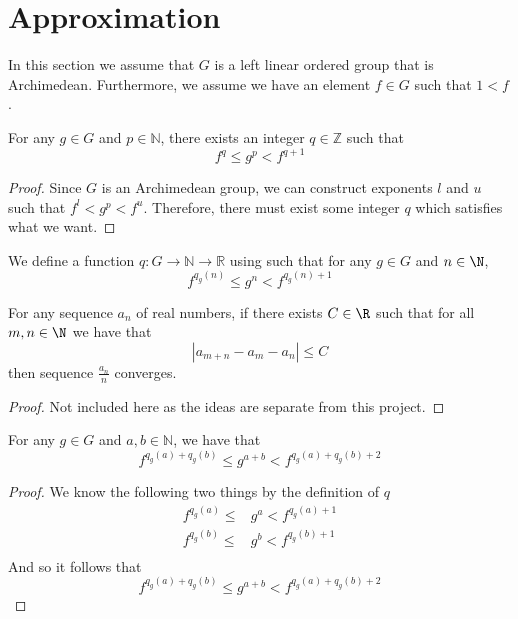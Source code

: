 \section{Approximation}
In this section we assume that $G$ is a left linear ordered group
that is Archimedean. Furthermore, we assume we have an element $f\in G$
such that $1 < f$.
\begin{theorem}\label{approximate}
    \leanok
    For any $g \in G$ and $p \in \mathbb{N}$,
    there exists an integer $q \in \mathbb{Z}$
    such that
    \[
        f^q \le g^p < f^{q+1}
    \]
\end{theorem}
\begin{proof}\leanok
Since $G$ is an Archimedean group, we can construct exponents $l$ and $u$
such that $f^l < g^p < f^u$. Therefore, there must exist some integer $q$
which satisfies what we want.
\end{proof}

\begin{definition}\label{def:q}
    \leanok{}
    We define a function $q \colon G \to \mathbb{N} \to \mathbb{R}$
    using  such that for any $g\in G$ and $n \in \N$,
    \[
        f^{q_g(n)} \le g^n < f^{q_g(n)+1}
    \]
\end{definition}

\begin{theorem}\label{sequence_convergence}
    \leanok
    For any sequence $a_n$ of real numbers,
    if there exists $C \in \R$ such that for all $m,n\in \N$
    we have that
    \[
        |a_{m+n} - a_m - a_n| \le C
    \]
    then sequence $\frac{a_n}{n}$ converges.
\end{theorem}
\begin{proof}\leanok
Not included here as the ideas
are separate from this project.
\end{proof}

\begin{theorem}\label{q_exp_add}
    \leanok{}
    For any $g \in G$ and $a,b \in \mathbb{N}$, we have that
    \[
        f^{q_g(a) + q_g(b)} \le g^{a+b} < f^{q_g(a) + q_g(b) + 2}
    \]
\end{theorem}
\begin{proof}\leanok
We know the following two things by the definition of $q$
\begin{align*}
f^{q_g(a)}\le &g^a < f^{q_g(a)+1}\\
f^{q_g(b)}\le &g^b < f^{q_g(b)+1}\\
\end{align*}
And so it follows that
\[
f^{q_g(a)+q_g(b)}\le g^{a+b} < f^{q_g(a)+q_g(b) + 2}
\]
\end{proof}

